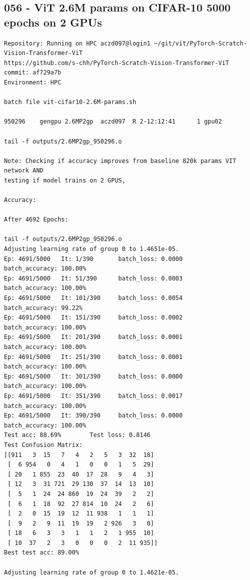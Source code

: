 \subsection{056 - ViT 2.6M params on CIFAR-10 5000 epochs on 2 GPUs}
\label{app_res:056}
\begin{verbatim}
Repository: Running on HPC aczd097@login1 ~/git/vit/PyTorch-Scratch-Vision-Transformer-ViT
https://github.com/s-chh/PyTorch-Scratch-Vision-Transformer-ViT
commit: af729a7b
Environment: HPC

batch file vit-cifar10-2.6M-params.sh

950296    gengpu 2.6MP2gp  aczd097  R 2-12:12:41      1 gpu02

tail -f outputs/2.6MP2gp_950296.o

Note: Checking if accuracy improves from baseline 820k params VIT network AND
testing if model trains on 2 GPUS, 

Accuracy: 

After 4692 Epochs:

tail -f outputs/2.6MP2gp_950296.o
Adjusting learning rate of group 0 to 1.4651e-05.
Ep: 4691/5000   It: 1/390       batch_loss: 0.0000      batch_accuracy: 100.00%
Ep: 4691/5000   It: 51/390      batch_loss: 0.0003      batch_accuracy: 100.00%
Ep: 4691/5000   It: 101/390     batch_loss: 0.0054      batch_accuracy: 99.22%
Ep: 4691/5000   It: 151/390     batch_loss: 0.0002      batch_accuracy: 100.00%
Ep: 4691/5000   It: 201/390     batch_loss: 0.0001      batch_accuracy: 100.00%
Ep: 4691/5000   It: 251/390     batch_loss: 0.0001      batch_accuracy: 100.00%
Ep: 4691/5000   It: 301/390     batch_loss: 0.0000      batch_accuracy: 100.00%
Ep: 4691/5000   It: 351/390     batch_loss: 0.0017      batch_accuracy: 100.00%
Ep: 4691/5000   It: 390/390     batch_loss: 0.0000      batch_accuracy: 100.00%
Test acc: 88.69%        Test loss: 0.8146
Test Confusion Matrix:
[[911   3  15   7   4   2   5   3  32  18]
 [  6 954   0   4   1   0   0   1   5  29]
 [ 20   1 855  23  40  17  28   9   4   3]
 [ 12   3  31 721  29 130  37  14  13  10]
 [  5   1  24  24 860  19  24  39   2   2]
 [  6   1  18  92  27 814  10  24   2   6]
 [  2   0  15  19  12  11 938   1   1   1]
 [  9   2   9  11  19  19   2 926   3   0]
 [ 18   6   3   3   1   1   2   1 955  10]
 [ 10  37   2   3   0   0   0   2  11 935]]
Best test acc: 89.00%

Adjusting learning rate of group 0 to 1.4621e-05.

\end{verbatim}

